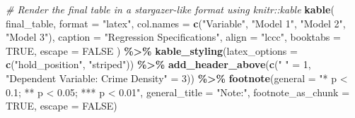 \documentclass[
]{article}
\newenvironment{Shaded}{\begin{snugshade}}{\end{snugshade}}
\newcommand{\AttributeTok}[1]{\textcolor[rgb]{0.13,0.29,0.53}{#1}}
\newcommand{\CommentTok}[1]{\textcolor[rgb]{0.56,0.35,0.01}{\textit{#1}}}
\newcommand{\ConstantTok}[1]{\textcolor[rgb]{0.56,0.35,0.01}{#1}}
\newcommand{\DecValTok}[1]{\textcolor[rgb]{0.00,0.00,0.81}{#1}}
\newcommand{\FunctionTok}[1]{\textcolor[rgb]{0.13,0.29,0.53}{\textbf{#1}}}
\newcommand{\NormalTok}[1]{#1}
\newcommand{\OtherTok}[1]{\textcolor[rgb]{0.56,0.35,0.01}{#1}}
\newcommand{\SpecialCharTok}[1]{\textcolor[rgb]{0.81,0.36,0.00}{\textbf{#1}}}
\newcommand{\StringTok}[1]{\textcolor[rgb]{0.31,0.60,0.02}{#1}}
\begin{document}
\begin{Shaded}
\begin{Highlighting}[]
\CommentTok{\# Render the final table in a stargazer{-}like format using knitr::kable}
\FunctionTok{kable}\NormalTok{(}
\NormalTok{  final\_table,}
  \AttributeTok{format =} \StringTok{"latex"}\NormalTok{,}
  \AttributeTok{col.names =} \FunctionTok{c}\NormalTok{(}\StringTok{"Variable"}\NormalTok{, }\StringTok{"Model 1"}\NormalTok{, }\StringTok{"Model 2"}\NormalTok{, }\StringTok{"Model 3"}\NormalTok{),}
  \AttributeTok{caption =} \StringTok{"Regression Specifications"}\NormalTok{,}
  \AttributeTok{align =} \StringTok{"lccc"}\NormalTok{,}
  \AttributeTok{booktabs =} \ConstantTok{TRUE}\NormalTok{,}
  \AttributeTok{escape =} \ConstantTok{FALSE}
\NormalTok{) }\SpecialCharTok{\%\textgreater{}\%}
  \FunctionTok{kable\_styling}\NormalTok{(}\AttributeTok{latex\_options =} \FunctionTok{c}\NormalTok{(}\StringTok{"hold\_position"}\NormalTok{, }\StringTok{"striped"}\NormalTok{)) }\SpecialCharTok{\%\textgreater{}\%}
  \FunctionTok{add\_header\_above}\NormalTok{(}\FunctionTok{c}\NormalTok{(}\StringTok{" "} \OtherTok{=} \DecValTok{1}\NormalTok{, }\StringTok{"Dependent Variable: Crime Density"} \OtherTok{=} \DecValTok{3}\NormalTok{)) }\SpecialCharTok{\%\textgreater{}\%}
  \FunctionTok{footnote}\NormalTok{(}\AttributeTok{general =} \StringTok{"* p \textless{} 0.1; ** p \textless{} 0.05; *** p \textless{} 0.01"}\NormalTok{, }
           \AttributeTok{general\_title =} \StringTok{"Note:"}\NormalTok{, }
           \AttributeTok{footnote\_as\_chunk =} \ConstantTok{TRUE}\NormalTok{, }
           \AttributeTok{escape =} \ConstantTok{FALSE}\NormalTok{)}
\end{Highlighting}
\end{Shaded}
\end{document}
